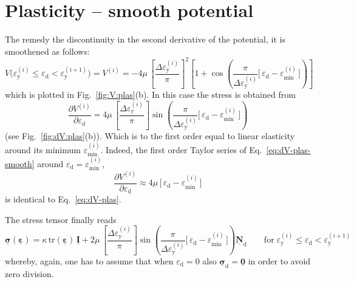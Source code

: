 \documentclass[times,namecite]{goose-article}
\newcommand\T[1]{\underline{\bm{{#1}}}}
\begin{document}
\section{Plasticity -- smooth potential}

The remedy the discontinuity in the second derivative of the potential, it is smoothened as follows:
\begin{equation}\label{eq:V-plas-smooth}
  V \big(
    \varepsilon_\mathrm{y}^{(i)} \leq \varepsilon_\mathrm{d} < \varepsilon_\mathrm{y}^{(i+1)}
  \big)
  =
  V^{(i)}
  =
  - 4 \mu \,
  \left[ \frac{\Delta \varepsilon_\mathrm{y}^{(i)}}{\pi} \right]^2
  \left[
    1
    +
    \cos \left(
      \frac{ \pi }{ \Delta \varepsilon_\mathrm{y}^{(i)} }
      \Big[\, \varepsilon_\mathrm{d} - \varepsilon_\mathrm{min}^{(i)} \,\Big]
    \right)
  \right]
\end{equation}
which is plotted in Fig.~\ref{fig:V:plas}(b). In this case the stress is obtained from
\begin{equation}\label{eq:dV-plas-smooth}
  \frac{\partial V^{(i)}}{\partial \varepsilon_\mathrm{d}}
  =
  4 \mu \,
  \left[ \frac{\Delta \varepsilon_\mathrm{y}^{(i)}}{\pi} \right]
  \sin \left(
    \frac{ \pi }{ \Delta \varepsilon_\mathrm{y}^{(i)} }
    \Big[\, \varepsilon_\mathrm{d} - \varepsilon_\mathrm{min}^{(i)} \,\Big]
  \right)
\end{equation}
(see Fig.~\ref{fig:dV:plas}(b)). Which is to the first order equal to linear elasticity around its minimum $\varepsilon_\mathrm{min}^{(i)}$. Indeed, the first order Taylor series of Eq.~\eqref{eq:dV-plas-smooth} around $\varepsilon_\mathrm{d} = \varepsilon_\mathrm{min}^{(i)}$,
\begin{equation}
  \frac{\partial V^{(i)}}{\partial \varepsilon_\mathrm{d}}
  \approx
  4 \mu \, \Big[\, \varepsilon_\mathrm{d} - \varepsilon_\mathrm{min}^{(i)} \,\Big]
\end{equation}
is identical to Eq.~\eqref{eq:dV-plas}.

The stress tensor finally reads
\begin{equation}
  \T{\sigma} ( \T{\varepsilon} )
  =
  \kappa \, \mathrm{tr} ( \T{\varepsilon} ) \, \T{I}
  +
  2 \mu \,
  \left[ \frac{\Delta \varepsilon_\mathrm{y}^{(i)}}{\pi} \right]
  \sin \left(
    \frac{ \pi }{ \Delta \varepsilon_\mathrm{y}^{(i)} }
    \Big[\, \varepsilon_\mathrm{d} - \varepsilon_\mathrm{min}^{(i)} \,\Big]
  \right)
  \T{N}_\mathrm{d}
  \qquad
  \mathrm{for}
  \;
  \varepsilon_\mathrm{y}^{(i)} \leq \varepsilon_\mathrm{d} < \varepsilon_\mathrm{y}^{(i+1)}
\end{equation}
whereby, again, one has to assume that when $\varepsilon_\mathrm{d} = 0$ also $\T{\sigma}_\mathrm{d} = \T{0}$ in order to avoid zero division.
\end{document}
